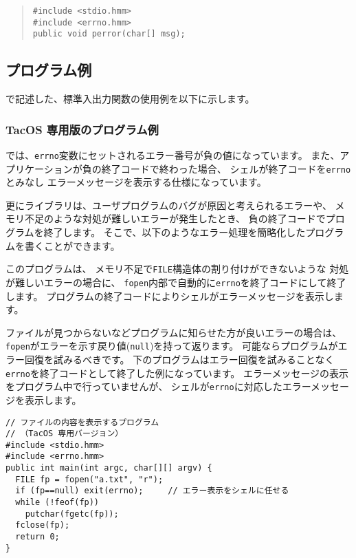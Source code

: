 \begin{quote}
\begin{verbatim}
#include <stdio.hmm>
#include <errno.hmm>
public void perror(char[] msg);
\end{verbatim}
\end{quote}

\subsection{プログラム例}

\cmml で記述した、標準入出力関数の使用例を以下に示します。

\subsubsection{TacOS 専用版のプログラム例}

\tacos では、\verb/errno/変数にセットされるエラー番号が負の値になっています。
また、アプリケーションが負の終了コードで終わった場合、
シェルが終了コードを\verb/errno/とみなし
エラーメッセージを表示する仕様になっています。

更にライブラリは、ユーザプログラムのバグが原因と考えられるエラーや、
メモリ不足のような対処が難しいエラーが発生したとき、
負の終了コードでプログラムを終了します。
そこで、以下のようなエラー処理を簡略化したプログラムを書くことができます。

このプログラムは、
メモリ不足で\verb/FILE/構造体の割り付けができないような
対処が難しいエラーの場合に、
\verb/fopen/内部で自動的に\verb/errno/を終了コードにして終了します。
プログラムの終了コードによりシェルがエラーメッセージを表示します。

ファイルが見つからないなどプログラムに知らせた方が良いエラーの場合は、
\verb/fopen/がエラーを示す戻り値(\verb/null/)を持って返ります。
可能なら{\cmm}プログラムがエラー回復を試みるべきです。
下のプログラムはエラー回復を試みることなく
\verb/errno/を終了コードとして終了した例になっています。
エラーメッセージの表示をプログラム中で行っていませんが、
シェルが\verb/errno/に対応したエラーメッセージを表示します。

\begin{mylist}
\begin{verbatim}
// ファイルの内容を表示するプログラム
// （TacOS 専用バージョン）
#include <stdio.hmm>
#include <errno.hmm>
public int main(int argc, char[][] argv) {
  FILE fp = fopen("a.txt", "r");
  if (fp==null) exit(errno);     // エラー表示をシェルに任せる
  while (!feof(fp))
    putchar(fgetc(fp));
  fclose(fp);
  return 0;
}
\end{verbatim}
\end{mylist}

